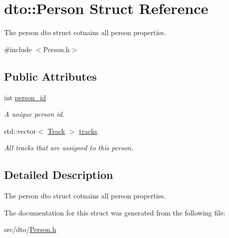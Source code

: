 \hypertarget{structdto_1_1_person}{}\section{dto\+:\+:Person Struct Reference}
\label{structdto_1_1_person}


The person dto struct cotnains all person properties.  




{\ttfamily \#include $<$Person.\+h$>$}

\subsection*{Public Attributes}
\begin{DoxyCompactItemize}
\item 
\mbox{\label{structdto_1_1_person_ad3f902c62430f7fb246edc153c2df2e6}} 
int \mbox{\hyperlink{structdto_1_1_person_ad3f902c62430f7fb246edc153c2df2e6}{person\+\_\+id}}
\begin{DoxyCompactList}\small\item\em A unique person id. \end{DoxyCompactList}\item 
\mbox{\label{structdto_1_1_person_ac710dbb9c5d574c213f0fa80f2670634}} 
std\+::vector$<$ \mbox{\hyperlink{structdto_1_1_track}{Track}} $>$ \mbox{\hyperlink{structdto_1_1_person_ac710dbb9c5d574c213f0fa80f2670634}{tracks}}
\begin{DoxyCompactList}\small\item\em All tracks that are assigned to this person. \end{DoxyCompactList}\end{DoxyCompactItemize}


\subsection{Detailed Description}
The person dto struct cotnains all person properties. 

The documentation for this struct was generated from the following file\+:\begin{DoxyCompactItemize}
\item 
src/dto/\mbox{\hyperlink{_person_8h}{Person.\+h}}\end{DoxyCompactItemize}
